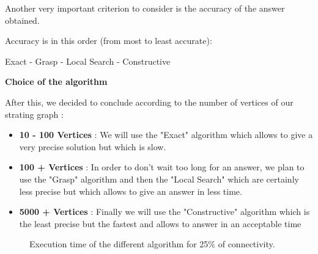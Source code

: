 Another very important criterion to consider is the accuracy of the answer obtained. \bigskip 

Accuracy is in this order (from most to least accurate):

Exact - Grasp - Local Search - Constructive \bigskip 

\large\textbf{Choice of the algorithm} \newline

After this, we decided to conclude according to the number of vertices of our strating graph :

\begin{itemize}
    \item \textbf{10 - 100 Vertices} : We will use the "Exact" algorithm which allows to give a very precise solution but which is slow.

    \item \textbf{100 + Vertices} : In order to don't wait too long for an answer, we plan to use the "Grasp" algorithm and then the "Local Search" which are certainly less precise but which allows to give an answer in less time.

    \item \textbf{5000 + Vertices} : Finally we will use the "Constructive" algorithm which is the least precise but the fastest and allows to answer in an acceptable time

\end{itemize}

\begin{figure}[H]
    \centering
    \caption{Execution time of the different algorithm for 25\% of connectivity.}
    \label{fig:algorithm_25_time}
\end{figure}

